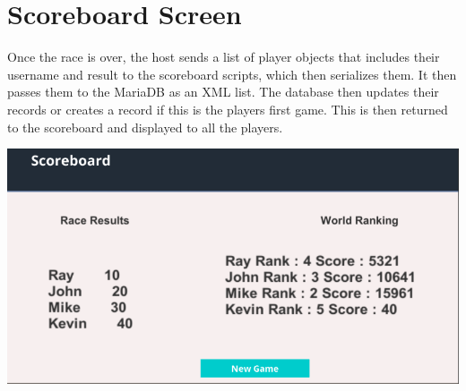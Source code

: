 \section{Scoreboard Screen}

Once the race is over, the host sends a list of player objects that includes their username and result to the scoreboard scripts, which then serializes them. It then passes them to the MariaDB as an XML list. The database then updates their records or creates a record if this is the players first game. This is then returned to the scoreboard and displayed to all the players.
\newline 

\includegraphics[width=1\columnwidth]{img/results.PNG}